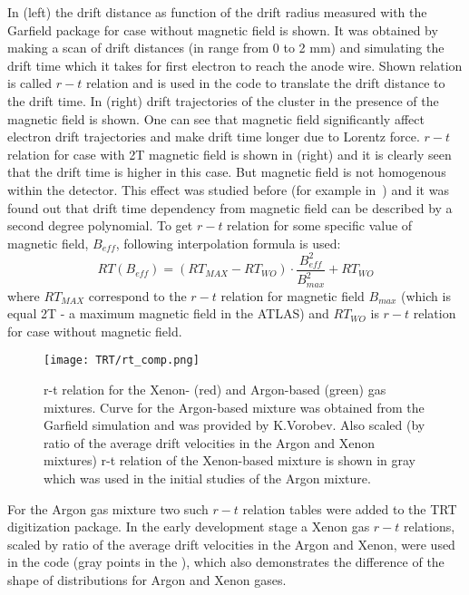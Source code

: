 In  (left) the drift distance as function of the drift radius measured with the Garfield package for case without magnetic field is shown.
It was obtained by making a scan of drift distances (in range from 0 to 2 mm) and simulating the drift time which it takes for first electron to reach the anode wire.
Shown relation is called $r-t$ relation and is used in the code to translate the drift distance to the drift time.
In  (right) drift trajectories of the cluster in the presence of the magnetic field is shown. One can see that magnetic field
significantly affect electron drift trajectories and make drift time longer due to Lorentz force. $r-t$ relation for case with 2T magnetic field is shown
in  (right) and it is clearly seen that the drift time is higher in this case. But magnetic field is not homogenous within the detector.
This effect was studied before (for example in~\cite{esben_thesis}) and it was found out that drift time dependency from magnetic field can be 
described by a second degree polynomial. 
To get $r-t$ relation for some specific value of magnetic field, $B_{eff}$, following interpolation formula is used:
\begin{displaymath}
    RT(B_{eff}) = (RT_{MAX} - RT_{WO}) \cdot \dfrac{B_{eff}^2}{B_{max}^2} + RT_{WO}
\end{displaymath}
where $RT_{MAX}$ correspond to the $r-t$ relation for magnetic field $B_{max}$ (which is equal 2T - a maximum magnetic field in the ATLAS) and $RT_{WO}$ is 
$r-t$ relation for case without magnetic field.

\begin{figure}
\centering
 \texttt{[image: TRT/rt\_comp.png]}
\caption{r-t relation for the Xenon- (red) and Argon-based (green) gas mixtures. Curve for the Argon-based mixture was obtained from the Garfield simulation and
was provided by K.Vorobev. Also scaled (by ratio of the average drift velocities in the Argon and Xenon mixtures) 
r-t relation of the Xenon-based mixture is shown in gray which was used in the initial studies of the Argon mixture.
}
\label{fig:rt_comp}
\end{figure}

For the Argon gas mixture two such $r-t$ relation tables were added to the TRT digitization package.
In the early development stage a Xenon gas $r-t$ relations, scaled by ratio of the average drift velocities in the Argon and Xenon, were used in the code 
(gray points in the ), which also demonstrates the difference of the shape of distributions for Argon and Xenon gases.

